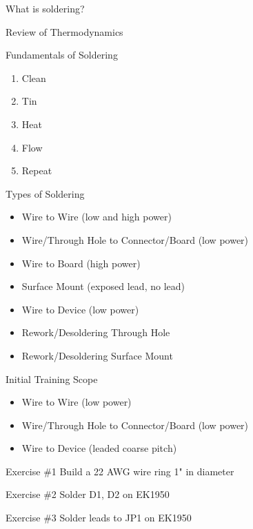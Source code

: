 \documentclass[aspectratio=169]{beamer}
\begin{document}
\begin{frame}{What is soldering?}
    
\end{frame}
\begin{frame}{Review of Thermodynamics}
    
\end{frame}
\begin{frame}{Fundamentals of Soldering}
    \begin{enumerate}
        \item Clean
        \item Tin
        \item Heat
        \item Flow
        \item Repeat
    \end{enumerate}
\end{frame}
\begin{frame}{Types of Soldering}
    \begin{itemize}
        \item Wire to Wire (low and high power)
        \item Wire/Through Hole to Connector/Board (low power)
        \item Wire to Board (high power)
        \item Surface Mount (exposed lead, no lead)
        \item Wire to Device (low power)
        \item Rework/Desoldering Through Hole
        \item Rework/Desoldering Surface Mount
    \end{itemize}
\end{frame}
\begin{frame}{Initial Training Scope}
    \begin{itemize}
        \item Wire to Wire (low power)
        \item Wire/Through Hole to Connector/Board (low power)
        \item Wire to Device (leaded coarse pitch)
    \end{itemize}
\end{frame}
\begin{frame}{Exercise \#1}
    Build a 22 AWG wire ring 1" in diameter
\end{frame}
\begin{frame}{Exercise \#2}
    Solder D1, D2 on EK1950
\end{frame}
\begin{frame}{Exercise \#3}
    Solder leads to JP1 on EK1950
\end{frame}
\end{document}
